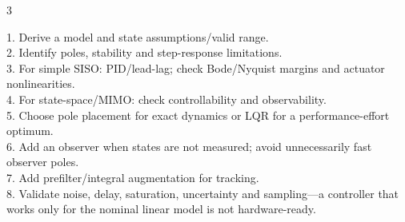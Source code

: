 \documentclass[a4paper,8pt]{extarticle}
\makeatletter
\newcommand{\topicdot}[1]{\tikz[baseline=-0.6ex]\fill[#1] (0,0) circle (0.52ex);}
\newcommand{\Cdot}{\topicdot{classicalDot}}
\newcommand{\Fdot}{\topicdot{freqDot}}
\newcommand{\Sdot}{\topicdot{stateDot}}
\newcommand{\Odot}{\topicdot{observerDot}}
\newcommand{\Ldot}{\topicdot{optimalDot}}
\newcommand{\Edot}{\topicdot{examDot}}
\newcommand{\mybox}[2]{
\begin{tcolorbox}[
  enhanced,
  colback=lightblue!7!white,
  colframe=lightblue!78!black,
  boxrule=0.38pt,
  boxsep=0.7pt,
  left=1.7pt,right=1.7pt,top=1.5pt,bottom=1.5pt,
  arc=0.8pt,outer arc=0.8pt,
  title={\small\textbf{#1}},
  fonttitle=\bfseries,
  coltitle=black,
  before skip=1.5pt,after skip=1.5pt,
  fontupper=\fontsize{5.55pt}{6.30pt}\selectfont\RaggedRight
]
#2
\end{tcolorbox}}
\newcommand{\frow}[2]{%
\begin{tabularx}{\linewidth}{@{}>{$\displaystyle}l<{$}@{\hspace{3pt}}X@{}}
#1 & #2
\end{tabularx}\vspace{0.3pt}}
\newcommand{\qrow}[2]{%
\textbf{#1} #2\par}
\newcommand{\tinyhead}[1]{\textbf{#1}\;}
\makeatother
\begin{document}
\begin{multicols}{3}
\mybox{Integrated Design Workflow \Edot}{
1. Derive a model and state assumptions/valid range.\\
2. Identify poles, stability and step-response limitations.\\
3. For simple SISO: PID/lead-lag; check Bode/Nyquist margins and actuator nonlinearities.\\
4. For state-space/MIMO: check controllability and observability.\\
5. Choose pole placement for exact dynamics or LQR for a performance-effort optimum.\\
6. Add an observer when states are not measured; avoid unnecessarily fast observer poles.\\
7. Add prefilter/integral augmentation for tracking.\\
8. Validate noise, delay, saturation, uncertainty and sampling---a controller that works only for the nominal linear model is not hardware-ready.
}





\end{multicols}
\end{document}
